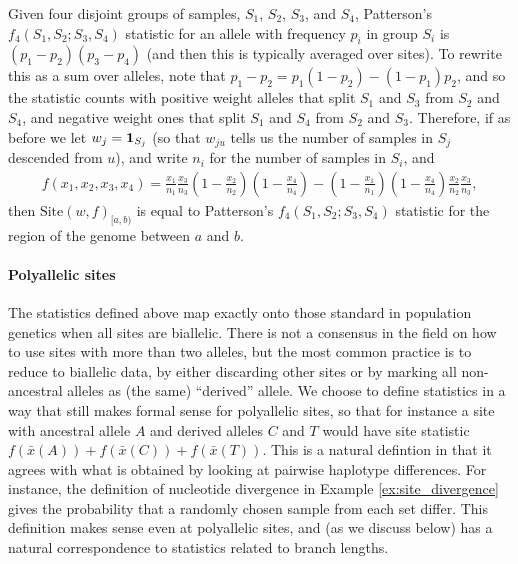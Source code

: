 \documentclass{article}
\newcommand{\site}{\mbox{Site}} %
\newcommand{\iw}{w} %
\newcommand{\aw}{{\bar x}} %
\begin{document}

\begin{example}[Patterson's $f_4$] \label{ex:site_f4}
    Given four disjoint groups of samples, $S_1$, $S_2$, $S_3$, and $S_4$,
    Patterson's $f_4(S_1, S_2; S_3, S_4)$ statistic for an allele with frequency $p_i$ in group $S_i$
    is $(p_1 - p_2)(p_3 - p_4)$ (and then this is typically averaged over sites).
    To rewrite this as a sum over alleles, note that
    $p_1 - p_2 = p_1 (1 - p_2) - (1 - p_1) p_2$,
    and so the statistic counts with positive weight
    alleles that split $S_1$ and $S_3$ from $S_2$ and $S_4$,
    and negative weight ones that split $S_1$ and $S_4$ from $S_2$ and $S_3$.
    Therefore, if as before we
    let $\iw_j = \bone_{S_j}$
    (so that $\iw_{ju}$ tells us the number of samples in $S_j$ descended from $u$),
    and write $n_i$ for the number of samples in $S_i$, and
    \begin{align*}
        f(x_1, x_2, x_3, x_4)
        =
        \frac{x_1}{n_1}
        \frac{x_3}{n_3}
        \left(1 - \frac{x_2}{n_2}\right)
        \left(1 - \frac{x_4}{n_4}\right)
        -
        \left(1 - \frac{x_1}{n_1}\right)
        \left(1 - \frac{x_4}{n_4}\right)
        \frac{x_2}{n_2}
        \frac{x_3}{n_3} ,
    \end{align*}
    then $\site(\iw, f)_{[a,b)}$ is equal to Patterson's $f_4(S_1, S_2; S_3, S_4)$ statistic
    for the region of the genome between $a$ and $b$.
\end{example}

\paragraph{Polyallelic sites}
The statistics defined above map exactly onto those standard in population genetics
when all sites are biallelic.
There is not a consensus in the field
on how to use sites with more than two alleles, but the most common practice is
to reduce to biallelic data, by either discarding other sites
or by marking all non-ancestral alleles as (the same) ``derived'' allele.
We choose to define statistics in a way that still makes formal sense for polyallelic sites,
so that for instance a site with ancestral allele $A$ and derived alleles $C$ and $T$
would have site statistic $f(\aw(A)) + f(\aw(C)) + f(\aw(T))$.
This is a natural defintion in that it agrees with what is obtained by
looking at pairwise haplotype differences.
For instance, the definition of nucleotide divergence in Example \ref{ex:site_divergence}
gives the probability that a randomly chosen sample from each set differ.
This definition makes sense even at polyallelic sites,
and (as we discuss below) has a natural correspondence to statistics related to branch lengths.
\end{document}
